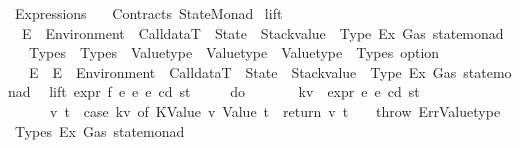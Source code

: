 %
\begin{isabellebody}%
%
%
\isadelimdocument
%
\endisadelimdocument
%
\isatagdocument
%
\isamarkuptrue%
%
\endisatagdocument
{\isafolddocument}%
%
\isadelimdocument
%
\endisadelimdocument
%
\isadelimtheory
%
\endisadelimtheory
%
\isatagtheory
{}\isamarkupfalse%
\ Expressions\isanewline
\ \ \ Contracts\ StateMonad\isanewline
{}%
\endisatagtheory
{\isafoldtheory}%
%
\isadelimtheory
%
\endisadelimtheory
%
\isadelimdocument
%
\endisadelimdocument
%
\isatagdocument
%
\isamarkuptrue%
%
\endisatagdocument
{\isafolddocument}%
%
\isadelimdocument
%
\endisadelimdocument
{}\isamarkupfalse%
\ lift\ {\isacharcolon}{\kern0pt}{\isacharcolon}{\kern0pt}\isanewline
\ \ {\isachardoublequoteopen}{\isacharparenleft}{\kern0pt}E\ {\isasymRightarrow}\ Environment\ {\isasymRightarrow}\ CalldataT\ {\isasymRightarrow}\ State\ {\isasymRightarrow}\ {\isacharparenleft}{\kern0pt}Stackvalue\ {\isacharasterisk}{\kern0pt}\ Type{\isacharcomma}{\kern0pt}\ Ex{\isacharcomma}{\kern0pt}\ Gas{\isacharparenright}{\kern0pt}\ state{\isacharunderscore}{\kern0pt}monad{\isacharparenright}{\kern0pt}\isanewline
\ \ {\isasymRightarrow}\ {\isacharparenleft}{\kern0pt}Types\ {\isasymRightarrow}\ Types\ {\isasymRightarrow}\ Valuetype\ {\isasymRightarrow}\ Valuetype\ {\isasymRightarrow}\ {\isacharparenleft}{\kern0pt}Valuetype\ {\isacharasterisk}{\kern0pt}\ Types{\isacharparenright}{\kern0pt}\ option{\isacharparenright}{\kern0pt}\isanewline
\ \ {\isasymRightarrow}\ E\ {\isasymRightarrow}\ E\ {\isasymRightarrow}\ Environment\ {\isasymRightarrow}\ CalldataT\ {\isasymRightarrow}\ State\ {\isasymRightarrow}\ {\isacharparenleft}{\kern0pt}Stackvalue\ {\isacharasterisk}{\kern0pt}\ Type{\isacharcomma}{\kern0pt}\ Ex{\isacharcomma}{\kern0pt}\ Gas{\isacharparenright}{\kern0pt}\ state{\isacharunderscore}{\kern0pt}monad{\isachardoublequoteclose}\isanewline
{}\isanewline
\ \ {\isachardoublequoteopen}lift\ expr\ f\ e{}\ e{}\ e\ cd\ st\ {\isasymequiv}\isanewline
\ \ \ \ {\isacharparenleft}{\kern0pt}do\ {\isacharbraceleft}{\kern0pt}\isanewline
\ \ \ \ \ \ kv{}\ {\isasymleftarrow}\ expr\ e{}\ e\ cd\ st{\isacharsemicolon}{\kern0pt}\isanewline
\ \ \ \ \ \ {\isacharparenleft}{\kern0pt}v{}{\isacharcomma}{\kern0pt}\ t{}{\isacharparenright}{\kern0pt}\ {\isasymleftarrow}\ case\ kv{}\ of\ {\isacharparenleft}{\kern0pt}KValue\ v{}{\isacharcomma}{\kern0pt}\ Value\ t{}{\isacharparenright}{\kern0pt}\ {\isasymRightarrow}\ return\ {\isacharparenleft}{\kern0pt}v{}{\isacharcomma}{\kern0pt}\ t{}{\isacharparenright}{\kern0pt}\ {\isacharbar}{\kern0pt}\ {\isacharunderscore}{\kern0pt}\ {\isasymRightarrow}\ {\isacharparenleft}{\kern0pt}throw\ Err{\isacharcolon}{\kern0pt}{\isacharcolon}{\kern0pt}{\isacharparenleft}{\kern0pt}Valuetype\ {\isacharasterisk}{\kern0pt}\ Types{\isacharcomma}{\kern0pt}\ Ex{\isacharcomma}{\kern0pt}\ Gas{\isacharparenright}{\kern0pt}\ state{\isacharunderscore}{\kern0pt}monad{\isacharparenright}{\kern0pt}{\isacharsemicolon}{\kern0pt}\isanewline

\end{isabellebody}
